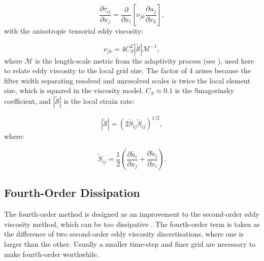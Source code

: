 \begin{equation}
\frac{\partial \tau_{ij}}{\partial x_j} = \frac{\partial}{\partial x_i} \left [ \nu_{jk}\frac{\partial u_j}{\partial x_k} \right ],
\end{equation}
with the anisotropic tensorial eddy viscosity:

\begin{equation}
\nu_{jk} = 4C_S^2 \left | \mathcal{\tilde S} \right | \mathcal{M}^{-1},
\end{equation}
where $\mathcal{M}$ is the length-scale metric from the adaptivity process (see \citet{pain2001}), used here to relate eddy viscosity to the local grid size. The factor of 4 arises because the filter width separating resolved and unresolved scales is twice the local element size, which is squared in the viscosity model. $C_S \approx 0.1$ is the Smagorinsky coefficient, and $\left | \mathcal{\tilde S} \right |$ is the local strain rate:

\begin{equation}
\left | \mathcal{\tilde S} \right | = (2 \tilde S_{ij} \tilde S_{ij})^{1/2},
\end{equation}
where:

\begin{equation}
\tilde S_{ij} = \frac 1 2 \left ( \frac{\partial \tilde u_i}{\partial x_j} + \frac{\partial \tilde u_j}{\partial x_i} \right ).
\end{equation}

\subsection{Fourth-Order Dissipation}

The fourth-order method is designed as an improvement to the second-order eddy viscosity method, which can be too dissipative \citep{adam}. The fourth-order term is taken as the difference of two second-order eddy viscosity discretisations, where one is larger than the other. Usually a smaller time-step and finer grid are necessary to make fourth-order worthwhile.

